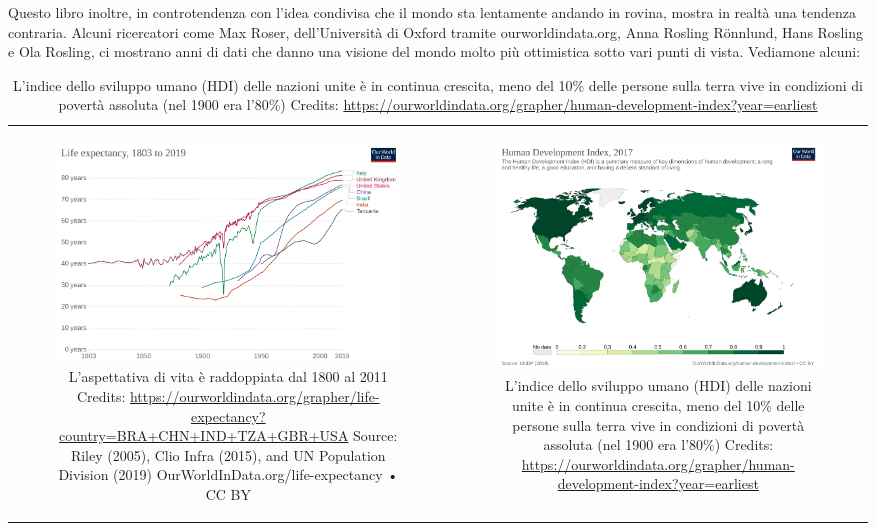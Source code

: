 \documentclass[12pt]{book} %
\begin{document}
Questo libro inoltre, in controtendenza con l'idea condivisa che il mondo sta lentamente andando in
rovina, mostra in realtà una tendenza contraria. Alcuni ricercatori come Max Roser, dell'Università di Oxford tramite
ourworldindata.org, Anna Rosling Rönnlund, Hans Rosling e Ola Rosling, ci mostrano anni di dati che danno una visione
del mondo molto più ottimistica sotto vari punti di vista. Vediamone alcuni:

\begin{table}[H]
\centering
\begin{tabular}{cc}
  \begin{subfigure}{0.5\textwidth}
    \centering
    \includegraphics[width=0.8\linewidth]{images/Libro-img006.png}
    \caption{L'aspettativa di vita è raddoppiata dal 1800 al 2011
Credits: \protect\url{https://ourworldindata.org/grapher/life-expectancy?country=BRA+CHN+IND+TZA+GBR+USA} Source: Riley (2005), Clio
Infra (2015), and UN Population Division (2019) OurWorldInData.org/life-expectancy • CC BY}
  \end{subfigure}
  &
  \begin{subfigure}{0.5\textwidth}
    \centering
    \includegraphics[width=0.8\linewidth]{images/Libro-img007.png}
    \caption{L'indice dello sviluppo umano (HDI) delle nazioni unite è in continua crescita, meno del 10\% delle
persone sulla terra vive in condizioni di povertà assoluta (nel 1900 era l'80\%)
Credits: \protect\url{https://ourworldindata.org/grapher/human-development-index?year=earliest}}
  \end{subfigure}
\end{tabular}
\end{table}
\end{document}
